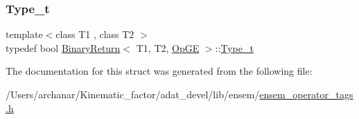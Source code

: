 \subsubsection{\texorpdfstring{Type\_t}{Type\_t}\hspace{0.1cm}{\footnotesize\ttfamily [2/2]}}
{\footnotesize\ttfamily template$<$class T1 , class T2 $>$ \\
typedef bool \mbox{\hyperlink{structBinaryReturn}{Binary\+Return}}$<$ T1, T2, \mbox{\hyperlink{structOpGE}{Op\+GE}} $>$\+::\mbox{\hyperlink{structBinaryReturn_3_01T1_00_01T2_00_01OpGE_01_4_a6bd095ff97c42640d8b1f733b75cf784}{Type\+\_\+t}}}



The documentation for this struct was generated from the following file\+:\begin{DoxyCompactItemize}
\item 
/\+Users/archanar/\+Kinematic\+\_\+factor/adat\+\_\+devel/lib/ensem/\mbox{\hyperlink{lib_2ensem_2ensem__operator__tags_8h}{ensem\+\_\+operator\+\_\+tags.\+h}}\end{DoxyCompactItemize}
